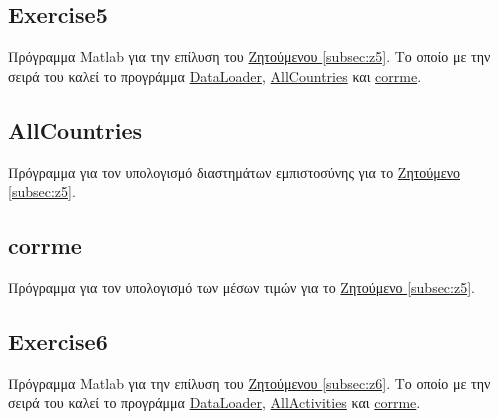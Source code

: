 \documentclass[11pt]{scrartcl} %
\begin{document}
	
	
\subsection{Exercise5}
\label{prog:5}
Πρόγραμμα Matlab για την επίλυση του \hyperref[subsection:z5]{Ζητούμενου \ref*{subsec:z5}}. Το οποίο με την σειρά του καλεί το προγράμμα \hyperref[prog:DataLoader]{DataLoader}, \hyperref[prog:AllCountries]{AllCountries} και \hyperref[prog:corrme]{corrme}.


\subsection{AllCountries}
\label{prog:AllCountries}
Πρόγραμμα για τον υπολογισμό διαστημάτων εμπιστοσύνης για το \hyperref[subsection:z5]{Ζητούμενο \ref*{subsec:z5}}.


\subsection{corrme}
\label{prog:corrme}
Πρόγραμμα για τον υπολογισμό των μέσων τιμών για το \hyperref[subsection:z5]{Ζητούμενο \ref*{subsec:z5}}.
	
	
	
	
		
\subsection{Exercise6}
\label{prog:6}
Πρόγραμμα Matlab για την επίλυση του \hyperref[subsection:z6]{Ζητούμενου \ref*{subsec:z6}}. Το οποίο με την σειρά του καλεί το προγράμμα \hyperref[prog:DataLoader]{DataLoader}, \hyperref[prog:AllActivities]{AllActivities} και \hyperref[prog:corrme]{corrme}.

\end{document}
